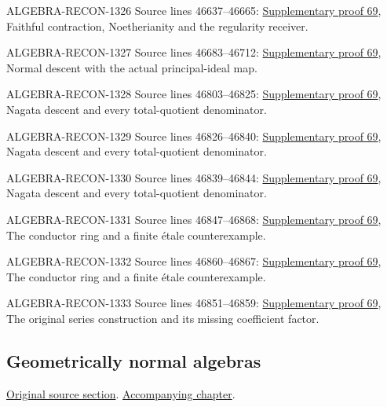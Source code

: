\begin{AlgebraSourceRoutes}
\item[ALGEBRA-RECON-1326] Source lines 46637--46665: \hyperlink{algebra_descent_notes_20260929}{Supplementary proof 69}, Faithful contraction, Noetherianity and the regularity receiver.
\item[ALGEBRA-RECON-1327] Source lines 46683--46712: \hyperlink{algebra_descent_notes_20260929}{Supplementary proof 69}, Normal descent with the actual principal-ideal map.
\item[ALGEBRA-RECON-1328] Source lines 46803--46825: \hyperlink{algebra_descent_notes_20260929}{Supplementary proof 69}, Nagata descent and every total-quotient denominator.
\item[ALGEBRA-RECON-1329] Source lines 46826--46840: \hyperlink{algebra_descent_notes_20260929}{Supplementary proof 69}, Nagata descent and every total-quotient denominator.
\item[ALGEBRA-RECON-1330] Source lines 46839--46844: \hyperlink{algebra_descent_notes_20260929}{Supplementary proof 69}, Nagata descent and every total-quotient denominator.
\item[ALGEBRA-RECON-1331] Source lines 46847--46868: \hyperlink{algebra_descent_notes_20260929}{Supplementary proof 69}, The conductor ring and a finite étale counterexample.
\item[ALGEBRA-RECON-1332] Source lines 46860--46867: \hyperlink{algebra_descent_notes_20260929}{Supplementary proof 69}, The conductor ring and a finite étale counterexample.
\item[ALGEBRA-RECON-1333] Source lines 46851--46859: \hyperlink{algebra_descent_notes_20260929}{Supplementary proof 69}, The original series construction and its missing coefficient factor.
\end{AlgebraSourceRoutes}

\subsection{Geometrically normal algebras}
\hypertarget{algebra-source-section-geometrically-normal}{}
\noindent\href{https://github.com/stacks/stacks-project/blob/a04446e57ec1fbc252a871afcec7752fb2807b14/algebra.tex\#L46878}{Original source section}. \href{algebra.pdf\#nameddest=section-geometrically-normal}{Accompanying chapter}.

